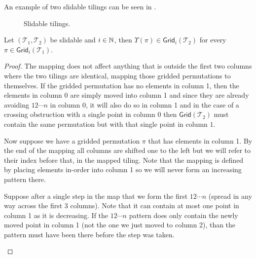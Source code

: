 An example of two slidable tilings can be seen in .

\begin{figure}[ht]
    \centering
    
    \caption{Slidable tilings.}
    \label{fig:slidable_tilings}
\end{figure}

\begin{lemma}\label{lem:slidemap}
Let $(\mathcal{T}_1,\mathcal{T}_2)$ be slidable and $i \in \mathbb{N}$, then $\Upsilon(\pi) \in \textsf{Grid}_i(\mathcal{T}_2)$ for every $\pi \in \textsf{Grid}_i(\mathcal{T}_1)$.
\end{lemma}
\begin{proof}
The mapping does not affect anything that is outside the first two columns where the two tilings are identical, mapping those gridded permutations to themselves. If the gridded permutation has no elements in column 1, then the elements in column $0$ are simply moved into column 1 and since they are already avoiding $12\dotsm n$ in column 0, it will also do so in column 1 and in the case of a crossing obstruction with a single point in column $0$ then $\textsf{Grid}(\mathcal{T}_2)$ must contain the same permutation but with that single point in column $1$.

Now suppose we have a gridded permutation $\pi$ that has elements in column 1. By the end of the mapping all columns are shifted one to the left but we will refer to their index before that, in the mapped tiling. Note that the mapping is defined by placing elements in-order into column 1 so we will never form an increasing pattern there.

Suppose after a single step in the map that we form the first $12\cdots n$ (spread in any way across the first 3 columns). Note that it can contain at most one point in column 1 as it is decreasing. If the $12\cdots n$ pattern does only contain the newly moved point in column 1 (not the one we just moved to column 2), than the pattern must have been there before the step was taken.

\begin{center}
\end{center}


\end{proof}
